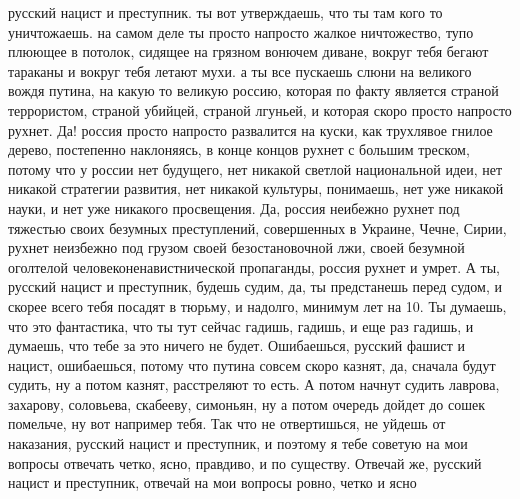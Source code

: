 русский нацист и преступник. ты вот утверждаешь, что ты там кого то
уничтожаешь.  на самом деле ты просто напросто жалкое ничтожество, тупо плюющее
в потолок, сидящее на грязном вонючем диване, вокруг тебя бегают тараканы и
вокруг тебя летают мухи.  а ты все пускаешь слюни на великого вождя путина, на
какую то великую россию, которая по факту является страной террористом, страной
убийцей, страной лгуньей, и которая скоро просто напросто рухнет. Да! россия
просто напросто развалится на куски, как трухлявое гнилое дерево, постепенно
наклоняясь, в конце концов рухнет с большим треском, потому что у россии нет
будущего, нет никакой светлой национальной идеи, нет никакой стратегии
развития, нет никакой культуры, понимаешь, нет уже никакой науки, и нет уже
никакого просвещения. Да, россия неибежно рухнет под тяжестью своих безумных
преступлений, совершенных в Украине, Чечне, Сирии, рухнет неизбежно под грузом
своей безостановочной лжи, своей безумной оголтелой человеконенавистнической
пропаганды, россия рухнет и умрет. А ты, русский нацист и преступник, будешь
судим, да, ты предстанешь перед судом, и скорее всего тебя посадят в тюрьму, и
надолго, минимум лет на 10. Ты думаешь, что это фантастика, что ты тут сейчас
гадишь, гадишь, и еще раз гадишь, и думаешь, что тебе за это ничего не будет.
Ошибаешься, русский фашист и нацист, ошибаешься, потому что путина совсем скоро
казнят, да, сначала будут судить, ну а потом казнят, расстреляют то есть. А
потом начнут судить лаврова, захарову, соловьева, скабееву, симоньян, ну а
потом очередь дойдет до сошек помельче, ну вот например тебя. Так что не
отвертишься, не уйдешь от наказания, русский нацист и преступник, и поэтому я
тебе советую на мои вопросы отвечать четко, ясно, правдиво, и по существу.
Отвечай же, русский нацист и преступник, отвечай на мои вопросы ровно, четко и
ясно

